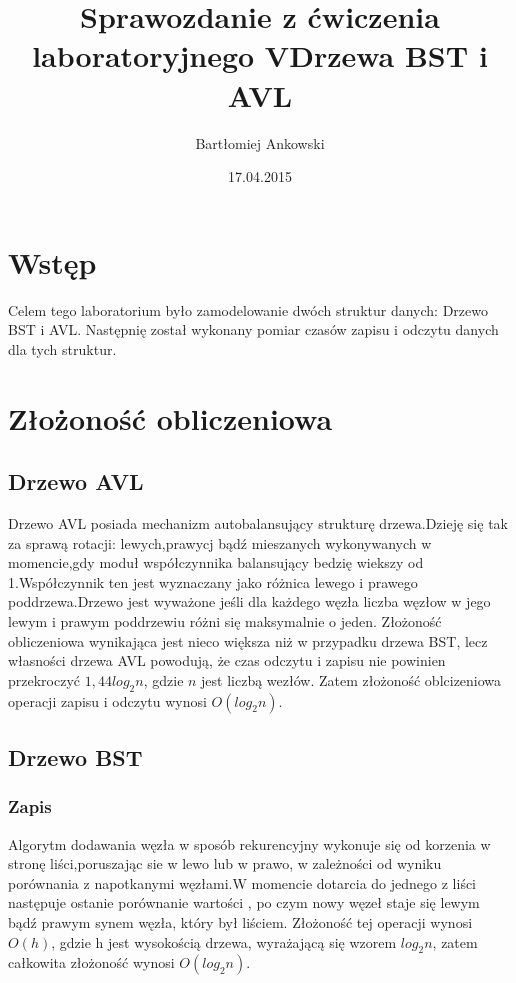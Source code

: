 \documentclass[12pt,a4paper,titlepage]{article}
\title{Sprawozdanie z ćwiczenia laboratoryjnego V\newline Drzewa BST i AVL}
\date{17.04.2015}
\author{Bartłomiej Ankowski}
\begin{document}
\maketitle
\pagestyle{empty}
\tableofcontents
\section{Wstęp}
Celem tego laboratorium było zamodelowanie dwóch struktur danych: Drzewo BST i AVL.
Następnię został wykonany pomiar czasów zapisu i odczytu danych dla tych struktur.
\section{Złożoność obliczeniowa}
\subsection{Drzewo AVL}

Drzewo AVL posiada mechanizm autobalansujący strukturę drzewa.Dzieję się tak za sprawą rotacji: lewych,prawycj bądź mieszanych wykonywanych w momencie,gdy moduł współczynnika balansujący bedzię wiekszy od 1.Współczynnik ten jest wyznaczany jako różnica lewego i prawego poddrzewa.Drzewo jest wyważone jeśli dla każdego węzła liczba węzłow w jego lewym i prawym poddrzewiu różni się maksymalnie o jeden.
Złożoność obliczeniowa wynikająca jest nieco większa niż w przypadku drzewa BST, lecz własności drzewa AVL powodują, że czas odczytu i zapisu nie powinien przekroczyć $1,44log_2n$, gdzie $n$ jest liczbą wezłów.
Zatem złożoność oblcizeniowa operacji zapisu i odczytu wynosi $O(log_2n)$.

\subsection{Drzewo BST}

\subsubsection{Zapis}
Algorytm dodawania węzła w sposób rekurencyjny wykonuje się od korzenia w stronę liści,poruszając sie w lewo lub w prawo, w zależności od wyniku porównania z napotkanymi węzłami.W momencie dotarcia do jednego z liści następuje ostanie porównanie wartości , po czym nowy węzeł staje się lewym bądź prawym synem węzła, który był liściem.
Złożoność tej operacji wynosi $O(h)$, gdzie h jest wysokością drzewa, wyrażającą się wzorem $log_2n$, zatem całkowita złożoność wynosi $O(log_2n)$.
\end{document}
